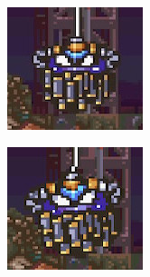 \begin{figure}[htp]
\begin{subfigure}{0.3\linewidth}
	\end{subfigure}
	\begin{subfigure}{0.3\linewidth}
		\centering
		\includegraphics[width=\linewidth]{figures/X2/Morph_moth/Moth_3.jpg}
	\end{subfigure}
	\vspace{2pt}
	\begin{subfigure}{0.3\linewidth}	
		\centering
		\includegraphics[width=\linewidth]{figures/X2/Morph_moth/Moth_4.jpg}

\end{subfigure}
\end{figure}
